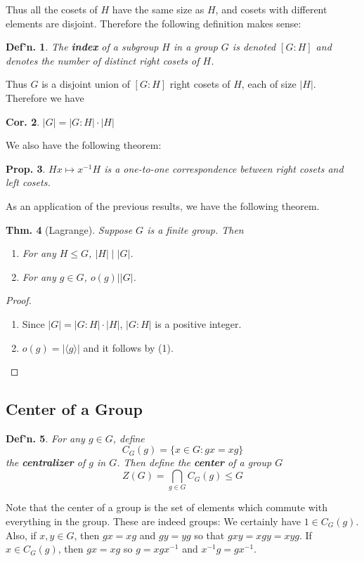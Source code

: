 \documentclass[12pt, a4paper]{book}
\newtheorem{theorem}{Thm.}[section]
\newtheorem{definition}[theorem]{Def'n.}
\newtheorem{corollary}[theorem]{Cor.}
\newtheorem{proposition}[theorem]{Prop.}
\theoremstyle{nonumberplain}
\newtheorem{proof}{Proof}
\begin{document}
Thus all the cosets of $H$ have the same size as $H$, and cosets with different elements are disjoint.
Therefore the following definition makes sense:
\begin{definition}
    The \textbf{index} of a subgroup $H$ in a group $G$ is denoted $[G:H]$ and denotes the number of distinct right cosets of $H$.
\end{definition}
Thus $G$ is a disjoint union of $[G:H]$ right cosets of $H$, each of size $|H|$.
Therefore we have
\begin{corollary}
    $|G|=|G:H|\cdot|H|$
\end{corollary}
We also have the following theorem:
\begin{proposition}
    $Hx\mapsto x^{-1}H$ is a one-to-one correspondence between right cosets and left cosets.
\end{proposition}
As an application of the previous results, we have the following theorem.
\begin{theorem}[Lagrange]
    Suppose $G$ is a finite group.
    Then
    \begin{enumerate}
        \item For any $H\leq G$, $|H|\mid|G|$.
        \item For any $g\in G$, $o(g)||G|$.
    \end{enumerate}
\end{theorem}
\begin{proof}
    \begin{enumerate}
        \item Since $|G|=|G:H|\cdot|H|$, $|G:H|$ is a positive integer.
        \item $o(g)=|\langle g\rangle|$ and it follows by (1).
    \end{enumerate}
\end{proof}
\subsection{Center of a Group}
\begin{definition}
    For any $g\in G$, define
    \[C_G(g)=\{x\in G:gx=xg\}\]
    the \textbf{centralizer} of $g$ in $G$.
    Then define the \textbf{center} of a group $G$
    \[Z(G)=\bigcap_{g\in G}C_G(g)\leq G\]
\end{definition}
Note that the center of a group is the set of elements which commute with everything in the group.
These are indeed groups:
We certainly have $1\in C_G(g)$.
Also, if $x,y\in G$, then $gx=xg$ and $gy=yg$ so that $gxy=xgy=xyg$.
If $x\in C_G(g)$, then $gx=xg$ so $g=xgx^{-1}$ and $x^{-1}g=gx^{-1}$.
\end{document}
